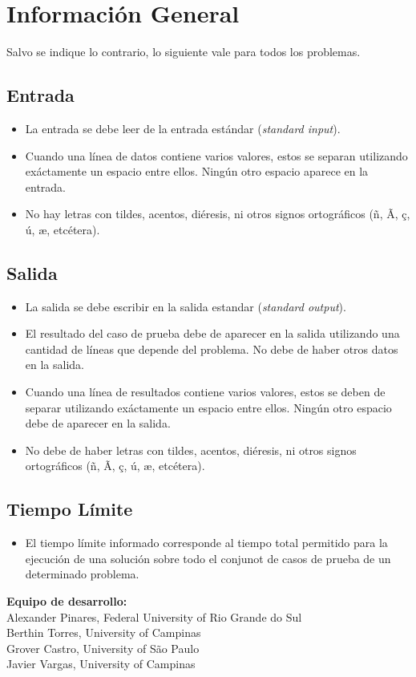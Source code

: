 \documentclass[12pt,oneside,a4paper]{book}
\theoremstyle{definition}
\begin{document}

\newpage 
\section*{Información General}
Salvo se indique lo contrario, lo siguiente vale para todos los problemas.

\subsection*{Entrada}
\begin{itemize}
  \item La entrada se debe leer de la entrada estándar (\textit{standard input}).
  \item Cuando una línea de datos contiene varios valores, estos se separan utilizando exáctamente un espacio entre ellos. Ningún otro espacio aparece en la entrada.
  \item No hay letras con tildes, acentos, diéresis, ni otros signos ortográficos (ñ, \~A, ç, ú, æ, etcétera).
\end{itemize}

\subsection*{Salida}
\begin{itemize}
  \item La salida se debe escribir en la salida estandar (\textit{standard output}).
  \item El resultado del caso de prueba debe de aparecer en la salida utilizando una cantidad de líneas que depende del problema. No debe de haber otros datos en la salida.
  \item Cuando una línea de resultados contiene varios valores, estos se deben de separar utilizando exáctamente un espacio entre ellos. Ningún otro espacio debe de aparecer en la salida.
  \item No debe de haber letras con tildes, acentos, diéresis, ni otros signos ortográficos (ñ, \~A, ç, ú, æ, etcétera).
\end{itemize}

\subsection*{Tiempo Límite}
\begin{itemize}
  \item El tiempo límite informado corresponde al tiempo total permitido para la ejecución de una solución sobre todo el conjunot de casos de prueba de un determinado problema.
\end{itemize}

\vfill
\begin{center}
\textbf{Equipo de desarrollo:}\\
Alexander Pinares, Federal University of Rio Grande do Sul\\
Berthin Torres, University of Campinas\\
Grover Castro, University of São Paulo\\
Javier Vargas, University of Campinas
\end{center}
\end{document}
